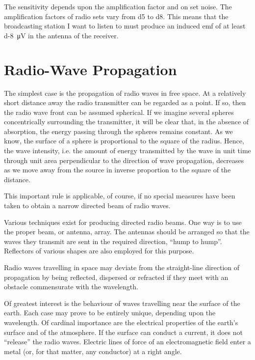 The sensitivity depends upon the amplification factor and on set noise. The amplification factors of radio sets vary from \num{d5} to \num{d8}. This means that the broadcasting station I want to listen to must produce an induced emf of at least \SI{d-8}{\micro\volt} in the antenna of the receiver.

\section{Radio-Wave Propagation}

The simplest case is the propagation of radio waves in free space. At a relatively short distance away the radio transmitter can be regarded as a point. If so, then the radio wave front can be assumed spherical. If we imagine several spheres concentrically surrounding the transmitter, it will be clear that, in the absence of absorption, the energy passing through the spheres remains constant. As we know, the surface of a sphere is proportional to the square of the radius. Hence, the wave intensity, i.e. the amount of energy transmitted by the wave in unit time through unit area perpendicular to the direction of wave propagation, decreases as we move away from the source in inverse proportion to the square of the distance.

This important rule is applicable, of course, if no special measures have been taken to obtain a narrow directed beam of radio waves.

Various techniques exist for producing directed radio beams. One way is to use the proper beam, or antenna, array. The antennas should be arranged so that the waves they transmit are sent in the required direction, ``hump to hump''. Reflectors of various shapes are also employed for this purpose.


Radio waves travelling in space may deviate from the straight-line direction of propagation by being reflected, dispersed or refracted if they meet with an obstacle commensurate with the wavelength.

Of greatest interest is the behaviour of waves travelling near the surface of the earth. Each case may prove to be entirely unique, depending upon the wavelength.
Of cardinal importance are the electrical properties of the earth's surface and of the atmosphere. If the surface can conduct a current, it does not ``release'' the radio waves. Electric lines of force of an electromagnetic field enter a metal (or, for that matter, any conductor) at a right angle.

